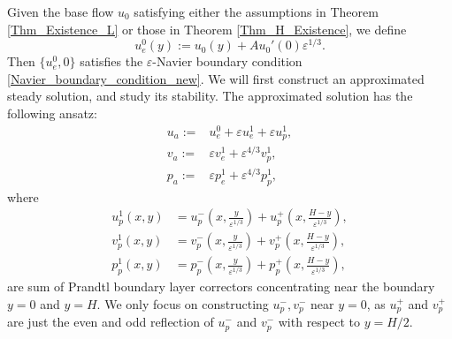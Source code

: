 \documentclass[reqno, 11pt]{amsart}
\theoremstyle{plain}
\theoremstyle{definition}
\theoremstyle{remark}
\numberwithin{equation}{section}
\begin{document}
Given the base flow $u_0$ satisfying either the assumptions in Theorem \ref{Thm_Existence_L} or those in Theorem \ref{Thm_H_Existence}, we define
$$
u_e^0(y) := u_0(y) + A u_0'(0) \varepsilon^{1/3}.
$$
Then $\{ u_e^0,0 \}$ satisfies the $\varepsilon$-Navier boundary condition \eqref{Navier_boundary_condition_new}. We will first construct an approximated steady solution, and study its stability. The approximated solution has the following ansatz:
\begin{equation}\label{approximated}
\begin{aligned}
u_a :=& u_e^0 + \varepsilon u_e^1 + \varepsilon u_p^1,\\
v_a :=& \varepsilon v_e^1 + \varepsilon^{4/3} v_p^1,\\
p_a :=& \varepsilon p_e^1 + \varepsilon^{4/3} p_p^1,
\end{aligned}
\end{equation}
where
\begin{align*}
u_p^1(x,y) &= u_p^-(x, \frac{y}{\varepsilon^{1/3}}) + u_p^+ (x, \frac{H-y}{\varepsilon^{1/3}}),\\
v_p^1(x,y) &= v_p^-(x, \frac{y}{\varepsilon^{1/3}}) + v_p^+ (x, \frac{H-y}{\varepsilon^{1/3}}),\\
p_p^1(x,y) &= p_p^-(x, \frac{y}{\varepsilon^{1/3}}) + p_p^+ (x, \frac{H-y}{\varepsilon^{1/3}}),
\end{align*}
are sum of Prandtl boundary layer correctors concentrating near the boundary $y = 0$ and $y = H$. We only focus on constructing $u_p^-, v_p^-$ near $y = 0$, as $u_p^+$ and $v_p^+$ are just the even and odd reflection of $u_p^-$ and $v_p^-$ with respect to $y = H/2$.
\end{document}
